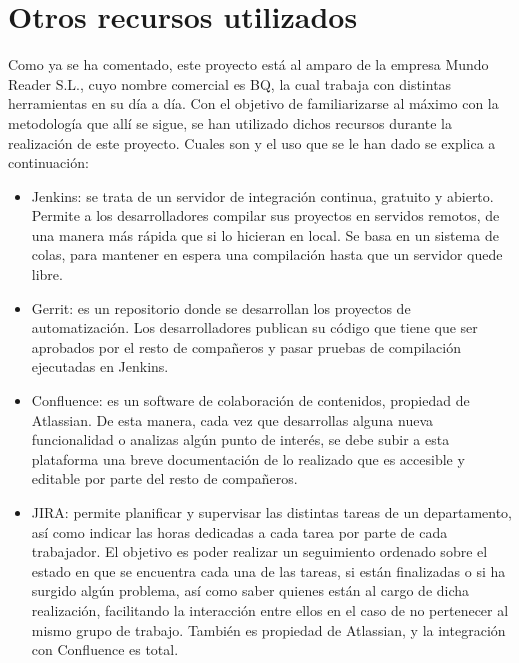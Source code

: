 \section{Otros recursos utilizados}
Como ya se ha comentado, este proyecto está al amparo de la empresa Mundo Reader S.L., cuyo nombre comercial es BQ, la cual trabaja con distintas herramientas en su día a día. Con el objetivo de familiarizarse al máximo con la metodología que allí se sigue, se han utilizado dichos recursos durante la realización de este proyecto. Cuales son y el uso que se le han dado se explica a continuación:

\begin{itemize}
	\item{Jenkins: se trata de un servidor de integración continua, gratuito y abierto. Permite a los desarrolladores compilar sus proyectos en servidos remotos, de una manera más rápida que si lo hicieran en local. Se basa en un sistema de colas, para mantener en espera una compilación hasta que un servidor quede libre.}
	\item{Gerrit: es un repositorio donde se desarrollan los proyectos de automatización. Los desarrolladores publican su código que tiene que ser aprobados por el resto de compañeros y pasar pruebas de compilación ejecutadas en Jenkins.}
	\item{Confluence: es un software de colaboración de contenidos, propiedad de Atlassian. De esta manera, cada vez que desarrollas alguna nueva funcionalidad o analizas algún punto de interés, se debe subir a esta plataforma una breve documentación de lo realizado que es accesible y editable por parte del resto de compañeros.}
	\item{JIRA: permite planificar y supervisar las distintas tareas de un departamento, así como indicar las horas dedicadas a cada tarea por parte de cada trabajador. El objetivo es poder realizar un seguimiento ordenado sobre el estado en que se encuentra cada una de las tareas, si están finalizadas o si ha surgido algún problema, así como saber quienes están al cargo de dicha realización, facilitando la interacción entre ellos en el caso de no pertenecer al mismo grupo de trabajo. También es propiedad de Atlassian, y la integración con Confluence es total.}
\end{itemize}





